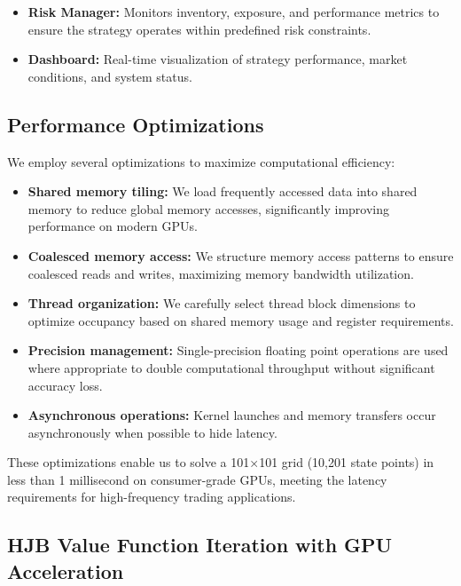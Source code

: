 \documentclass[twocolumn,11pt]{IEEEtran}  %
\begin{document}
\begin{onecolumn}
\begin{onecolumn}
\begin{itemize}
    \item \textbf{Risk Manager:} Monitors inventory, exposure, and performance metrics to ensure the strategy operates within predefined risk constraints.
    
    \item \textbf{Dashboard:} Real-time visualization of strategy performance, market conditions, and system status.
\end{itemize}

\subsection{Performance Optimizations}

We employ several optimizations to maximize computational efficiency:

\begin{itemize}
    \item \textbf{Shared memory tiling:} We load frequently accessed data into shared memory to reduce global memory accesses, significantly improving performance on modern GPUs.
    
    \item \textbf{Coalesced memory access:} We structure memory access patterns to ensure coalesced reads and writes, maximizing memory bandwidth utilization.
    
    \item \textbf{Thread organization:} We carefully select thread block dimensions to optimize occupancy based on shared memory usage and register requirements.
    
    \item \textbf{Precision management:} Single-precision floating point operations are used where appropriate to double computational throughput without significant accuracy loss.
    
    \item \textbf{Asynchronous operations:} Kernel launches and memory transfers occur asynchronously when possible to hide latency.
\end{itemize}

These optimizations enable us to solve a 101×101 grid (10,201 state points) in less than 1 millisecond on consumer-grade GPUs, meeting the latency requirements for high-frequency trading applications.

\subsection{HJB Value Function Iteration with GPU Acceleration}


\end{onecolumn}
\end{onecolumn}
\end{document}
